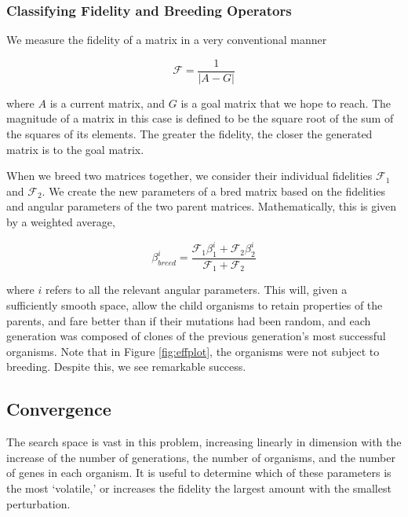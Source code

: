\documentclass[11pt,twocolumn]{article}
\begin{document}

	\subsubsection{Classifying Fidelity and Breeding Operators} \label{breeding}

	We measure the fidelity of a matrix in a very conventional manner

	\begin{equation}
    \mathcal{F} = \frac{1}{|A - G|}
    \end{equation}

	where $A$ is a current matrix, and $G$ is a goal matrix that we hope to reach.  The magnitude of a matrix in this case is defined to be the square root of the sum of the squares of its elements.  The greater the fidelity, the closer the generated matrix is to the goal matrix.  

	When we breed two matrices together, we consider their individual fidelities $\mathcal{F}_1$ and $\mathcal{F}_2$.  We create the new parameters of a bred matrix based on the fidelities and angular parameters of the two parent matrices. Mathematically, this is given by a weighted average,

	\begin{equation}
    \beta_{breed}^{i} = \frac{\mathcal{F}_1\beta_{1}^{i} + \mathcal{F}_2\beta_{2}^{i}}{\mathcal{F}_1 + \mathcal{F}_2}
    \end{equation}
    
	where $i$ refers to all the relevant angular parameters. This will, given a sufficiently smooth space, allow the child organisms to retain properties of the parents, and fare better than if their mutations had been random, and each generation was composed of clones of the previous generation's most successful organisms. Note that in Figure \ref{fig:effplot}, the organisms were not subject to breeding. Despite this, we see remarkable success. 



	\subsection{Convergence} \label{convergence}

	The search space is vast in this problem, increasing linearly in dimension with the increase of the number of generations, the number of organisms, and the number of genes in each organism. It is useful to determine which of these parameters is the most `volatile,' or increases the fidelity the largest amount with the smallest perturbation. 
\end{document}
